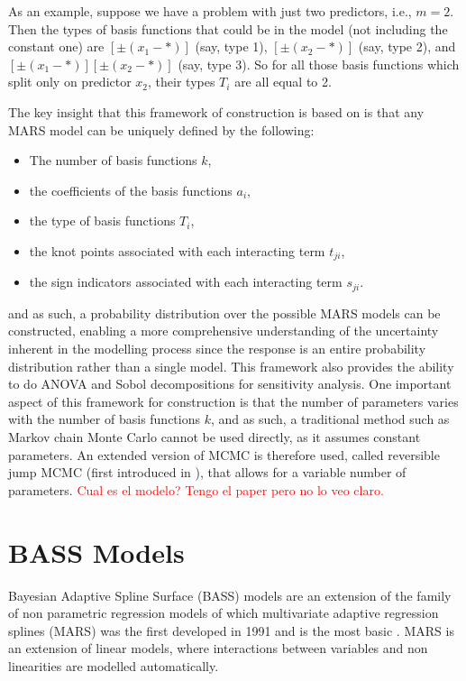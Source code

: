 As an example, suppose we have a problem with just two predictors, i.e., $m = 2$. Then the types of basis functions that could be in the model (not including the constant one) are $[\pm (x_1 - \ast)]$ (say, type 1), $[\pm (x_2 - \ast)]$ (say, type 2), and $[\pm (x_1 - \ast)][\pm (x_2 - \ast)]$ (say, type 3). So for all those basis functions which split only on predictor $x_2$, their types $T_i$ are all equal to 2.

The key insight that this framework of construction is based on is that any MARS model can be uniquely defined by the following: 
\begin{itemize}
	\item The number of basis functions $k$, 
	\item the coefficients of the basis functions $a_i$, 
	\item the type of basis functions $T_i$, 
	\item the knot points associated with each interacting term $t_{ji}$, 
	\item the sign indicators associated with each interacting term $s_{ji}$. 
\end{itemize}
and as such, a probability distribution over the possible MARS models can be constructed, enabling a more comprehensive understanding of the uncertainty inherent in the modelling process since the response is an entire probability distribution rather than a single model. This framework also provides the ability to do ANOVA and Sobol decompositions for sensitivity analysis. One important aspect of this framework for construction is that the number of parameters varies with the number of basis functions $k$, and as such, a traditional method such as Markov chain Monte Carlo cannot be used directly, as it assumes constant parameters. An extended version of MCMC is therefore used, called reversible jump MCMC (first introduced in \cite{green1995reversible}), that allows for a variable number of parameters. \textcolor{red}{Cual es el modelo? Tengo el paper pero no lo veo claro.}

\section{BASS Models}

Bayesian Adaptive Spline Surface (BASS) models are an extension of the family of non parametric regression models of which multivariate adaptive regression splines (MARS) was the first developed in 1991 and is the most basic \cite{friedman1991multivariate}. MARS is an extension of linear models, where interactions between variables and non linearities are modelled automatically. 

